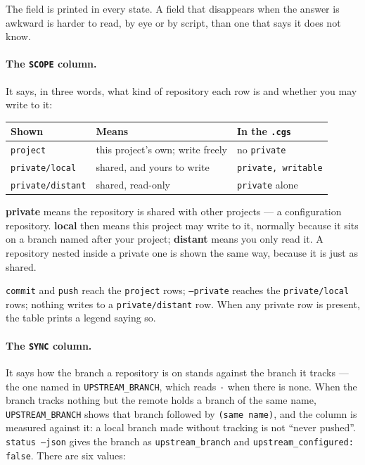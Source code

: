 The field is printed in every state. A field that disappears when the
answer is awkward is harder to read, by eye or by script, than one that
says it does not know.

\paragraph{The \texttt{SCOPE} column.} It says, in three words, what kind
of repository each row is and whether you may write to it:

\begin{center}
\begin{tabular}{lll}
\textbf{Shown} & \textbf{Means} & \textbf{In the \texttt{.cgs}} \\
\hline
\texttt{project}         & this project's own; write freely       & no \texttt{private} \\
\texttt{private/local}   & shared, and yours to write             & \texttt{private, writable} \\
\texttt{private/distant} & shared, read-only                      & \texttt{private} alone \\
\end{tabular}
\end{center}

\textbf{private} means the repository is shared with other projects --- a
configuration repository. \textbf{local} then means this project may write
to it, normally because it sits on a branch named after your project;
\textbf{distant} means you only read it. A repository nested inside a
private one is shown the same way, because it is just as shared.

\texttt{commit} and \texttt{push} reach the \texttt{project} rows;
\texttt{--private} reaches the \texttt{private/local} rows; nothing writes
to a \texttt{private/distant} row. When any private row is present, the
table prints a legend saying so.

\paragraph{The \texttt{SYNC} column.}
\label{sec:status-sync}
It says how the branch a repository
is on stands against the branch it tracks --- the one named in
\texttt{UPSTREAM\_BRANCH}, which reads \texttt{-} when there is none. When
the branch tracks nothing but the remote holds a branch of the same name,
\texttt{UPSTREAM\_BRANCH} shows that branch followed by
\texttt{(same name)}, and the column is measured against it: a local branch
made without tracking is not ``never pushed''. \texttt{status --json} gives
the branch as \texttt{upstream\_branch} and \texttt{upstream\_configured:
false}. There are six values:

